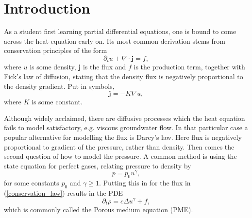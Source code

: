 \documentclass[11pt, a4paper]{article}
\begin{document}
\newpage

\tableofcontents
\pagestyle{plain}
\theoremstyle{plain}
\newtheorem{theorem}{Theorem}[section]
\newtheorem{proposition}{Proposition}[section]
\newtheorem{cor}{Corollary}[section]
\newtheorem{lemma}{Lemma}[section]

\newtheorem{assumption}{Assumption}[section]

\theoremstyle{definition}
\newtheorem{mydef}{Definition}[section]
\newtheorem{example}{Example}%

\newtheorem{obs}{Observation}
\newtheorem{rem}{Remark}




\newpage
\section{Introduction}
As a student first learning partial differential equations, one is bound to come across the heat equation early on. Its most common derivation stems from conservation principles of the form
\begin{equation}
\label{conservation_law}
\partial_t u + \nabla \cdot \textbf{j} = f,
\end{equation}
where $u$ is some density, $\textbf{j}$ is the flux and $f$ is the production term, together with Fick's law of diffusion, stating that the density flux is negatively proportional to the density gradient. Put in symbols,
\begin{equation*}
\textbf{j} = -K\nabla u,
\end{equation*}
where $K$ is some constant.

Although widely acclaimed, there are diffusive processes which the heat equation fails to model satisfactory, e.g. viscous groundwater flow. In that particular case a popular alternative for modelling the flux is Darcy's law. Here flux is negatively proportional to gradient of the pressure, rather than density. Then comes the second question of how to model the pressure. A common method is using the state equation for perfect gases, relating pressure to density by
\begin{equation*}
p = p_0 u^\gamma, 
\end{equation*}
for some constants $p_0$ and $\gamma \geq 1$. Putting this in for the flux in (\ref{conservation_law}) results in the PDE
\begin{equation}
\partial_t \rho = c \Delta u^\gamma +f,
\end{equation}
which is commonly called the Porous medium equation (PME).
\end{document}
